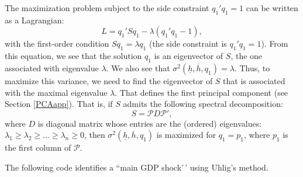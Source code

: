 \documentclass[
  12pt,
]{book}
\theoremstyle{definition}
\theoremstyle{definition}
\theoremstyle{definition}
\theoremstyle{definition}
\theoremstyle{remark}
\begin{document}
The maximization problem subject to the side constraint \(q_1'q_1=1\) can be written as a Lagrangian: \[
L=q_1'Sq_1-\lambda(q_1'q_1-1),
\]
with the first-order condition \(Sq_1=\lambda q_1\) (the side constraint is \(q_1'q_1=1\)). From this equation, we see that the solution \(q_1\) is an eigenvector of \(S\), the one associated with eigenvalue \(\lambda\). We also see that \(\sigma^2(\underline{h},\overline{h},q_1)=\lambda\). Thus, to maximize this variance, we need to find the eigenvector of \(S\) that is associated with the maximal eigenvalue \(\lambda\). That defines the first principal component (see Section \ref{PCAapp}). That is, if \(S\) admits the following spectral decomposition:
\[
S = \mathcal{P}D\mathcal{P}',
\]
where \(D\) is diagonal matrix whose entries are the (ordered) eigenvalues: \(\lambda_1 \ge \lambda_2 \ge \dots \ge \lambda_n \ge 0\), then \(\sigma^2(\underline{h},\overline{h},q_1)\) is maximized for \(q_1 = p_1\), where \(p_1\) is the first column of \(\mathcal{P}\).

The following code identifies a ``main GDP shock'\,' using Uhlig's method.
\end{document}
